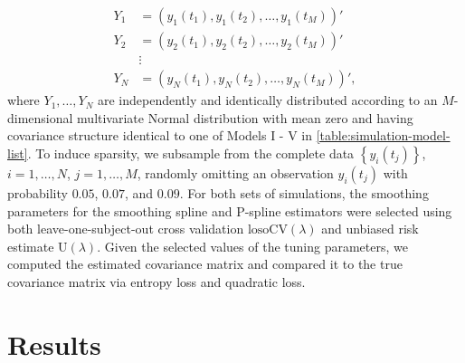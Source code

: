 \begin{align*}
Y_1 &= \left(y_1\left(t_1\right), y_1\left(t_2\right), \dots, y_1\left(t_M\right)\right)' \\
Y_2 &= \left(y_2\left(t_1\right), y_2\left(t_2\right), \dots, y_2\left(t_M\right)\right)' \\
&\vdots \\
Y_N &= \left(y_N\left(t_1\right), y_N\left(t_2\right), \dots, y_N\left(t_M\right)\right)',
\end{align*}
\noindent
where $Y_1,\dots, Y_N$ are independently and identically distributed according to an $M$-dimensional multivariate Normal distribution with mean zero and having covariance structure identical to one of Models I - V in \ref{table:simulation-model-list}. To induce sparsity, we subsample from the complete data $\left\{y_i\left(t_j\right) \right\}$, $i = 1,\dots, N$, $j = 1,\dots, M$, randomly omitting an observation $y_i\left(t_j\right)$ with probability $0.05$, $0.07$, and $0.09$. For both sets of simulations, the smoothing parameters for the smoothing spline and P-spline estimators were selected using both leave-one-subject-out cross validation $\mbox{losoCV}\left(\lambda\right)$ and unbiased risk estimate $\mbox{U}\left(\lambda\right)$. Given the selected values of the tuning parameters, we computed the estimated covariance matrix and compared it to the true covariance matrix via entropy loss and quadratic loss. 




\section{Results}

